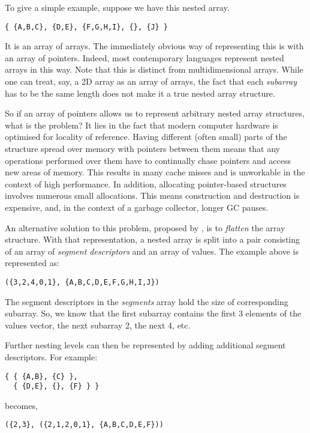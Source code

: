 To give a simple example, suppose we have this nested array.
%
\begin{lstlisting}
{ {A,B,C}, {D,E}, {F,G,H,I}, {}, {J} }
\end{lstlisting}
%
It is an array of arrays. The immediately obvious way of representing this is with an array of pointers. Indeed, most contemporary languages represent nested arrays in this way. Note that this is distinct from multidimensional arrays. While one can treat, say, a 2D array as an array of arrays, the fact that each \emph{subarray} has to be the same length does not make it a true nested array structure.

So if an array of pointers allows us to represent arbitrary nested array structures, what is the problem? It lies in the fact that modern computer hardware is optimised for locality of reference. Having different (often small) parts of the structure spread over memory with pointers between them means that any operations performed over them have to continually chase pointers and access new areas of memory. This results in many cache misses and is unworkable in the context of high performance. In addition, allocating pointer-based structures involves numerous small allocations. This means construction and destruction is expensive, and, in the context of a garbage collector, longer GC pauses.

An alternative solution to this problem, proposed by \citet{Blelloch:compiling1988}, is to \emph{flatten} the array structure. With that representation, a nested array is split into a pair consisting of an array of \emph{segment descriptors} and an array of values. The example above is represented as:
%
\begin{lstlisting}
({3,2,4,0,1}, {A,B,C,D,E,F,G,H,I,J})
\end{lstlisting}
%
The segment descriptors in the \emph{segments} array hold the size of corresponding subarray. So, we know that the first subarray contains the first 3 elements of the values vector, the next subarray 2, the next 4, etc.

Further nesting levels can then be represented by adding additional segment descriptors. For example:
%
\begin{lstlisting}
{ { {A,B}, {C} },
  { {D,E}, {}, {F} } }
\end{lstlisting}
%
becomes,
%
\begin{lstlisting}
({2,3}, ({2,1,2,0,1}, {A,B,C,D,E,F}))
\end{lstlisting}



